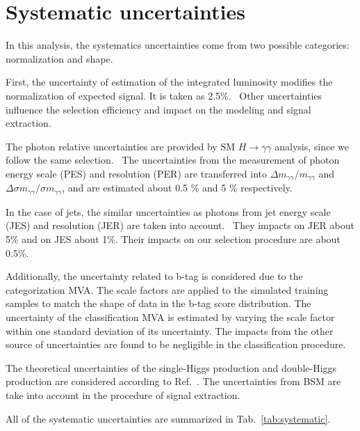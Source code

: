 
\section{Systematic uncertainties}

In this analysis, the systematics uncertainties come from two possible categories: normalization and shape.

First, the uncertainty of estimation of the integrated luminosity modifies the normalization of expected signal.
It is taken as 2.5\%.~\cite{CMS-PAS-LUM-17-001}
Other uncertainties influence the selection efficiency and impact on the modeling and signal extraction.

The photon relative uncertainties are provided by SM $H \rightarrow \gamma\gamma$ analysis, since we follow the same selection.~\cite{1407.0558}
The uncertainties from the measurement of photon energy scale (PES) and resolution (PER) are transferred into $\Delta m_{\gamma\gamma} / m_{\gamma\gamma}$ and $\Delta \sigma m_{\gamma\gamma} / \sigma m_{\gamma\gamma}$, and are estimated about 0.5 \% and 5 \% respectively.

In the case of jets, the similar uncertainties as photons from jet energy scale (JES) and resolution (JER) are taken into account.~\cite{1107.4277}
They impacts on JER about 5\% and on JES about 1\%.
Their impacts on our selection procedure are about 0.5\%.

Additionally, the uncertainty related to b-tag is considered due to the categorization MVA.
The scale factors are applied to the simulated training samples to match the shape of data in the b-tag score distribution.
The uncertainty of the classification MVA is estimated by varying the scale factor within one standard deviation of its uncertainty.
The impacts from the other source of uncertainties are found to be negligible in the classification procedure.

The theoretical uncertainties of the single-Higgs production and double-Higgs production are considered according to Ref.~\cite{1610.07922}. The uncertainties from BSM are take into account in the procedure of signal extraction.

All of the systematic uncertainties are summarized in Tab.~\ref{tab:systematic}.

